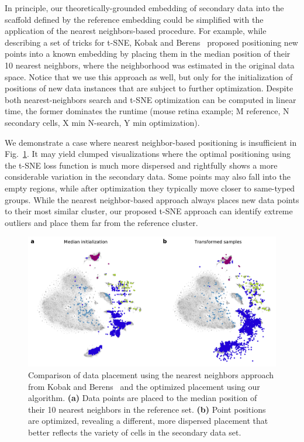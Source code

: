 \documentclass[runningheads]{llncs}
\begin{document}
In principle, our theoretically-grounded embedding of secondary data into the
scaffold defined by the reference embedding could be simplified with the
application of the nearest neighbors-based procedure. For example, while
describing a set of tricks for t-SNE, Kobak and Berens~\cite{art_of_using_tsne}
proposed positioning new points into a known embedding by placing them in the
median position of their 10 nearest neighbors, where the neighborhood was
estimated in the original data space. Notice that we use this approach as well,
but only for the initialization of positions of new data instances that are
subject to further optimization. Despite both nearest-neighbors search and
t-SNE optimization can be computed in linear time, the former dominates the
runtime (mouse retina example; M reference, N secondary cells, X min N-search,
Y min optimization). 

We demonstrate a case where nearest neighbor-based positioning is insufficient
in Fig.~\ref{fig:optimization}. It may yield clumped visualizations where the
optimal positioning using the t-SNE loss function is much more dispersed and
rightfully shows a more considerable variation in the secondary data. Some
points may also fall into the empty regions, while after optimization they
typically move closer to same-typed groups. While the nearest neighbor-based
approach always places new data points to their most similar cluster, our
proposed t-SNE approach can identify extreme outliers and place them far from
the reference cluster.


\begin{figure}[htbp]
  \includegraphics[width=\textwidth]{figures/optimization_retina.pdf}
  \caption{Comparison of data placement using the nearest neighbors approach
  from Kobak and Berens~\cite{art_of_using_tsne} and the optimized placement
  using our algorithm.  {\bf (a)} Data points are placed to the median position
  of their 10 nearest neighbors in the reference set. {\bf (b)} Point positions
  are optimized, revealing a different, more dispersed placement that better
  reflects the variety of cells in the secondary data set.}
  \label{fig:optimization}
\end{figure}
\end{document}
